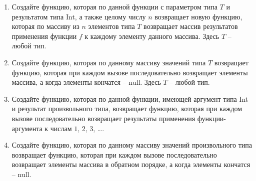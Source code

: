 \begin{enumerate}
	\item Создайте функцию, которая по данной функции с параметром типа $T$ и результатом типа Int, а также целому числу $n$
		возвращает новую функцию, которая по массиву из $n$ элементов типа $T$ возвращает массив результатов применения функции $f$ 
		к каждому элементу данного массива. Здесь $T$ -- любой тип.

	\item Создайте функцию, которая по данному массиву значений типа $T$ возвращает функцию, которая при каждом вызове последовательно
		возвращает элементы массива, а когда элементы кончатся -- null. Здесь $T$ -- любой тип.

	\item Создайте функцию, которая по данной функции, имеющей аргумент типа Int и результат произвольного типа, возвращает функцию, 
		которая при каждом вызове последовательно возвращает результаты применения функции-аргумента к числам $1$, $2$, $3$, \dots.
	\item Создайте функцию, которая по данному массиву значений произвольного типа возвращает функцию, которая при каждом вызове последовательно
		возвращает элементы массива в обратном порядке, а когда элементы кончатся -- null.


\end{enumerate}

